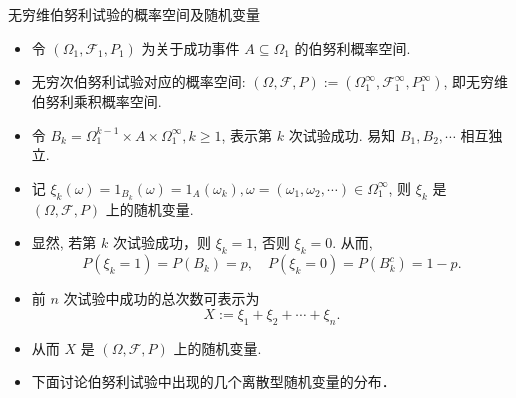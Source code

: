 \documentclass[Prob-All.tex]{subfiles}
\begin{document}
\begin{frame}{无穷维伯努利试验的概率空间及随机变量}
\begin{itemize}[<+-|alert@+>]
\item 令 $\left(\Omega_{1}, \mathscr{F}_{1}, P_{1}\right)$ 为关于成功事件 $A \subseteq \Omega_{1}$ 的伯努利概率空间.
\item 无穷次伯努利试验对应的概率空间: $(\Omega, \mathscr{F}, P):=\left(\Omega_{1}^{\infty}, \mathscr{F}_{1}^{\infty}, P_{1}^{\infty}\right)$, 即无穷维伯努利乘积概率空间.
\item 令 $B_{k}=\Omega_{1}^{k-1} \times A \times \Omega_{1}^{\infty}, k\geq 1$, 表示第 $k$ 次试验成功. 易知 $B_{1}, B_{2}, \cdots$ 相互独立.
\item 记 $ \xi_{k}(\omega)=1_{B_{k}}(\omega)=1_{A}\left(\omega_{k}\right),  \omega=\left(\omega_{1}, \omega_{2}, \cdots\right) \in \Omega_{1}^{\infty}$,
则 $\xi_{k}$ 是 $(\Omega, \mathscr{F}, P)$ 上的随机变量.
\item 显然, 若第 $k$ 次试验成功，则 $\xi_{k}=1$, 否则 $\xi_{k}=0$. 从而,
$$P\left(\xi_{k}=1\right)=P\left(B_{k}\right)=p, \quad P\left(\xi_{k}=0\right)=P\left(B_{k}^{c}\right)=1-p.$$
\item 前 $n$ 次试验中成功的总次数可表示为 $$X:=\xi_{1}+\xi_{2}+\cdots+\xi_{n}.$$
\item 从而 $X$ 是 $(\Omega, \mathscr{F}, P)$ 上的随机变量.
\item 下面讨论伯努利试验中出现的几个离散型随机变量的分布．
\end{itemize}



\end{frame}
\end{document}
